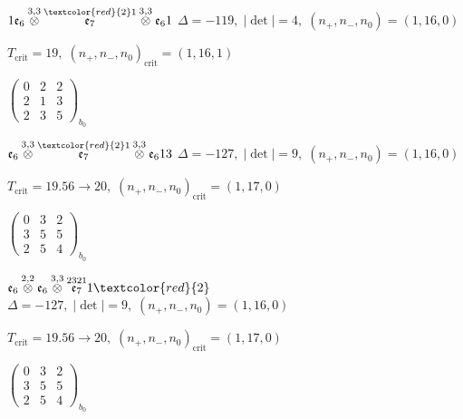 \documentclass[10pt]{article}
\begin{document}
$1\mathfrak{e}_6\overset{3,3}{\otimes}\overset{\textcolor{red}{2}1}{\mathfrak{e}_7}\overset{3,3}{\otimes}\mathfrak{e}_61$ \quad $\Delta=-119,\; |\det|=4,\; (n_+,n_-,n_0)=(1,16,0)$

\hspace{1em}$T_{\text{crit}}=19,\; (n_+,n_-,n_0)_{\text{crit}}=(1,16,1)$

\hspace{2em}$\left(\begin{smallmatrix}0 & 2 & 2 \\ 2 & 1 & 3 \\ 2 & 3 & 5\end{smallmatrix}\right)_{\!b_0}$

\smallskip

$\mathfrak{e}_6\overset{3,3}{\otimes}\overset{\textcolor{red}{2}1}{\mathfrak{e}_7}\overset{3,3}{\otimes}\mathfrak{e}_613$ \quad $\Delta=-127,\; |\det|=9,\; (n_+,n_-,n_0)=(1,16,0)$

\hspace{1em}$T_{\text{crit}}=19.56 \to 20,\; (n_+,n_-,n_0)_{\text{crit}}=(1,17,0)$

\hspace{2em}$\left(\begin{smallmatrix}0 & 3 & 2 \\ 3 & 5 & 5 \\ 2 & 5 & 4\end{smallmatrix}\right)_{\!b_0}$

\smallskip

$\mathfrak{e}_6\overset{2,2}{\otimes}\mathfrak{e}_6\overset{3,3}{\otimes}\overset{2321}{\mathfrak{e}_7}1\textcolor{red}{2}$ \quad $\Delta=-127,\; |\det|=9,\; (n_+,n_-,n_0)=(1,16,0)$

\hspace{1em}$T_{\text{crit}}=19.56 \to 20,\; (n_+,n_-,n_0)_{\text{crit}}=(1,17,0)$

\hspace{2em}$\left(\begin{smallmatrix}0 & 3 & 2 \\ 3 & 5 & 5 \\ 2 & 5 & 4\end{smallmatrix}\right)_{\!b_0}$

\smallskip
\end{document}
